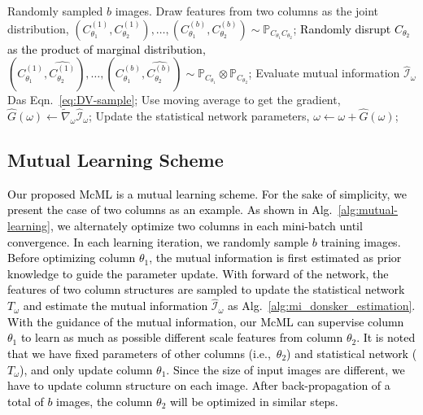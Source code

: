\documentclass[sigconf]{acmart}
\newcommand{\ljx}[1]{\textcolor{black}{#1}}
\newcommand{\czq}[1]{\textcolor{black}{#1}}
\newcommand{\II}{\mathcal{I}}
\newcommand{\PJ}[2]{\mathbb{P}_{#1#2}}  %
\newcommand{\PI}[2]{\mathbb{P}_{#1}\otimes\mathbb{P}_{#2}}  %
\newcommand\Eq{Eqn.}
\newcommand\Alg{Alg.}
\begin{document}
\setlength{\textfloatsep}{9pt}%
\begin{algorithm}[!t]
\small
\begin{algorithmic}[1]
\INPUT Randomly sampled $b$ images.
\STATE Draw features from two columns as the joint distribution, 
\STATE $(C_{\theta_1}^{(1)}, C_{\theta_2}^{(1)}), \ldots, (C_{\theta_1}^{(b)}, C_{\theta_2}^{(b)}) \sim \PJ{C_{\theta_1}}{C_{\theta_2}}$;
\STATE \czq{Randomly disrupt $C_{\theta_2}$ as the product of marginal distribution,}
\STATE $(C_{\theta_1}^{(1)},\widehat{C_{\theta_2}^{(1)}}), \ldots, (C_{\theta_1}^{(b)},\widehat{C_{\theta_2}^{(b)}}) \sim \PI{C_{\theta_1}}{C_{\theta_2}}$;
\STATE Evaluate mutual information $\widehat{\II}_\omega$ Das \Eq~\ref{eq:DV-sample};
\STATE Use moving average to get the gradient,
\STATE $\widehat{G}(\omega) \gets \widetilde{\nabla}_{\omega} \widehat{\II}_\omega$;
\STATE Update the statistic\ljx{al} network parameters,
\STATE $\omega \gets \omega + \widehat{G}(\omega)$; 
\end{algorithmic} 
\caption{Mutual Information Estimation 
\label{alg:mi_donsker_estimation}}
\end{algorithm}




\subsection{Mutual Learning Scheme}
\label{sec:mutual-learning-process}
\czq{Our proposed McML is a mutual learning \ljx{scheme}.
For the sake of simplicity, we present the case of two columns as an example.
As shown in \Alg~\ref{alg:mutual-learning}, we alternately optimize two columns in each mini-batch until convergence.
In each learning iteration, we randomly sample $b$ training images.
Before optimizing column $\theta_1$, the mutual information is first estimated as prior knowledge to guide the parameter update.
With forward of the network, the features of two column structures are sampled to update the statistical network $T_{\omega}$ and estimate the mutual information $\widehat{\II}_{\omega}$ as \Alg~\ref{alg:mi_donsker_estimation}.
With the guidance of the mutual information, our McML can supervise column $\theta_1$ to learn as much as possible different scale features from column $\theta_2$.
It is noted that we have fixed parameters of other columns (i.e.,~$\theta_2$) and statistic\ljx{al} network ($T_\omega$), and only update column $\theta_1$.
Since the size of input images are different, we have to update column structure on each image.
After back-propagation of a total of $b$ images, the column $\theta_2$ will be optimized in similar steps.}
\end{document}

